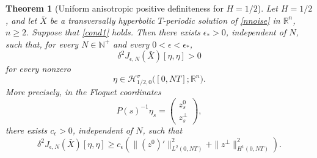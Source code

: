 \documentclass[preprint,12pt]{elsarticle}
\newtheorem{theorem}{Theorem}[section]
\theoremstyle{definition}
\theoremstyle{plain}
\begin{document}
\begin{theorem}[Uniform anisotropic positive definiteness for $H=1/2$]
\label{thm:persistence-H-half}
Let $H=1/2$, and let $\bar X$ be a transversally hyperbolic
$T$-periodic solution of \eqref{nnoise} in $\mathbb R^n$, $n\geq2$.
Suppose that \eqref{cond1} holds. Then there exists $\epsilon_*>0$,
independent of $N$, such that, for every $N\in\mathbb N^+$ and every
$0<\epsilon<\epsilon_*$,
\begin{equation*}
    \delta^2J_{\epsilon,N}(\bar X)[\eta,\eta]>0
\end{equation*}
for every nonzero
\begin{equation*}
    \eta\in
    \mathcal H_{1/2,0}^\sigma
    \bigl([0,NT];\mathbb R^n\bigr).
\end{equation*}
More precisely, in the Floquet coordinates
\begin{equation*}
    P(s)^{-1}\eta_s
    =
    \begin{pmatrix}
        z_s^0\\
        z_s^\perp
    \end{pmatrix},
\end{equation*}
there exists $c_\epsilon>0$, independent of $N$, such that
\begin{equation}
\label{eq:second-var-lower-H-half}
    \delta^2J_{\epsilon,N}(\bar X)[\eta,\eta]
    \geq
    c_\epsilon
    \left(
        \|(z^0)'\|_{L^2(0,NT)}^2
        +
        \|z^\perp\|_{H^1(0,NT)}^2
    \right).
\end{equation}
\end{theorem}
\end{document}

